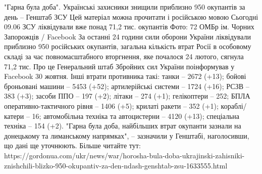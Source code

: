 "Гарна була доба". Українські захисники знищили приблизно 950 окупантів за день – Генштаб ЗСУ
Цей матеріал можна прочитати і російською мовою
Сьогодні 09.06
ЗСУ ліквідували вже понад 71,2 тис. окупантів
Фото: 72 ОМБр ім. Чорних Запорожців / Facebook
За останні 24 години сили оборони України ліквідували приблизно 950 російських окупантів, загальна кількість втрат Росії в особовому складі за час повномасштабного вторгнення, яке почалося 24 лютого, сягнула 71,2 тис.
Про це Генеральний штаб Збройних сил України поінформував у Facebook 30 жовтня.
Інші втрати противника такі:
танки – 2672 (+13);
бойові броньовані машини – 5453 (+52);
артилерійські системи – 1724 (+16);
РСЗВ – 383 (+3);
засоби ППО – 197 (+2);
літаки – 274 (+1);
гелікоптери – 252;
БПЛА оперативно-тактичного рівня – 1406 (+5);
крилаті ракети – 352 (+1);
кораблі/катери – 16;
автомобільна техніка та автоцистерни – 4120 (+13);
спеціальна техніка – 154 (+2).
"Гарна була доба, найбільших втрат окупанти зазнали на донецькому та лиманському напрямках", – зазначили у Генштабі, наголосивши, що дані ще уточнюють.
Більше читайте тут: https://gordonua.com/ukr/news/war/horosha-bula-doba-ukrajinski-zahisniki-znishchili-blizko-950-okupantiv-za-den-ndash-genshtab-zsu-1633555.html


